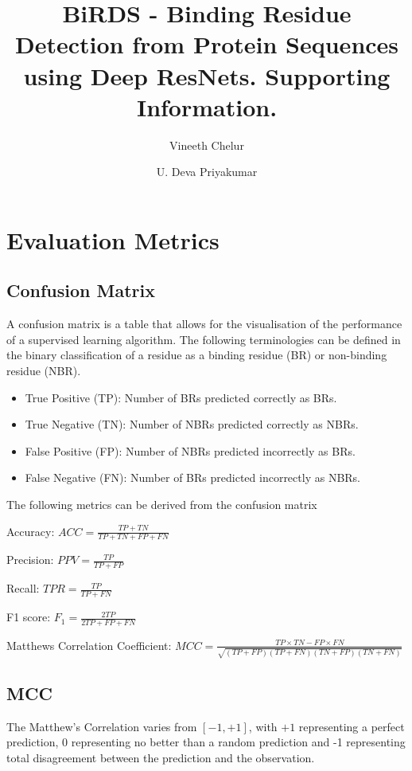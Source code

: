 \documentclass[journal=jcisd8,manuscript=article]{achemso}
\author{Vineeth Chelur}
\author{U. Deva Priyakumar}
\affiliation[IIIT-H]
{Center for Computational Natural Sciences \& Bioinformatics \\ International Institute of Information Technology \\ Hyderabad - 500032, India}
\title[BiRDS - Binding Residue Detection from Protein Sequences using Deep ResNets. Supporting Information.]
  {BiRDS - Binding Residue Detection from Protein Sequences using Deep ResNets. Supporting Information.}
\begin{document}
\thispagestyle{empty}

\tableofcontents

\listoftables

\listoffigures


\newpage

\section{Evaluation Metrics}
\subsection{Confusion Matrix}
A confusion matrix is a table that allows for the visualisation of the performance of a supervised learning algorithm. The following terminologies can be defined in the binary classification of a residue as a binding residue (BR) or non-binding residue (NBR).
\begin{itemize}
    \item True Positive (TP): Number of BRs predicted correctly as BRs.
    \item True Negative (TN): Number of NBRs predicted correctly as NBRs.
    \item False Positive (FP): Number of NBRs predicted incorrectly as BRs.
    \item False Negative (FN): Number of BRs predicted incorrectly as NBRs.
\end{itemize}

\noindent The following metrics can be derived from the confusion matrix

Accuracy: ${ACC} = \frac{TP + TN}{TP + TN + FP + FN}$

Precision: ${PPV} = \frac{TP}{TP + FP}$

Recall: ${TPR} = \frac{TP}{TP + FN}$

F1 score: ${F_1} = \frac{2TP}{2TP + FP + FN}$

Matthews Correlation Coefficient: ${MCC} = \frac{TP \times TN - FP \times FN}{\sqrt{(TP + FP)(TP + FN)(TN + FP)(TN + FN)}}$

\subsection{MCC}
\quad The Matthew's Correlation varies from $[-1, +1]$, with $+1$ representing a perfect prediction, 0 representing no better than a random prediction and -1 representing total disagreement between the prediction and the observation.
\end{document}
